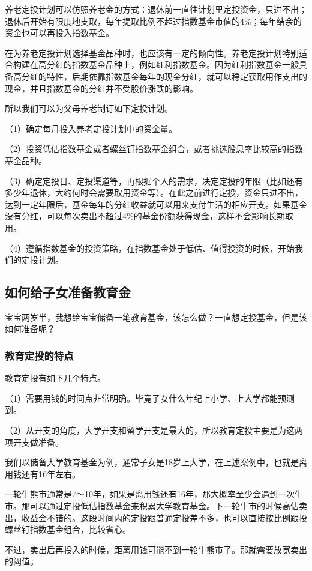 养老定投计划可以仿照养老金的方式：退休前一直往计划里定投资金，只进不出；退休后开始有限度地支取，每年提取比例不超过指数基金市值的4\%；每年结余的资金也可以再投入指数基金。

在为养老定投计划选择基金品种时，也应该有一定的倾向性。养老定投计划特别适合构建在高分红的指数基金品种上，例如红利指数基金。因为红利指数基金一般具备高分红的特性，后期依靠指数基金每年的现金分红，就可以稳定获取用作支出的现金，并且指数基金的分红并不受股价涨跌的影响。

所以我们可以为父母养老制订如下定投计划。

（1）确定每月投入养老定投计划中的资金量。

（2）投资低估指数基金或者螺丝钉指数基金组合，或者挑选股息率比较高的指数基金品种。

（3）确定定投日、定投渠道等，再根据个人的需求，决定定投的年限（比如还有多少年退休，大约何时会需要取用资金等）。在此之前进行定投，资金只进不出，达到一定年限后，基金每年的分红收益就可以用来支付生活的相应开支。如果基金没有分红，可以每次卖出不超过4\%的基金份额获得现金，这样不会影响长期取用。

（4）遵循指数基金的投资策略，在指数基金处于低估、值得投资的时候，开始我们的定投计划。

\subsection{如何给子女准备教育金}
{\kaishu 宝宝两岁半，我想给宝宝储备一笔教育基金，该怎么做？一直想定投基金，但是该如何准备呢？}

\subsubsection{教育定投的特点}

教育定投有如下几个特点。

（1）需要用钱的时间点非常明确。毕竟子女什么年纪上小学、上大学都能预测到。

（2）从开支的角度，大学开支和留学开支是最大的，所以教育定投主要是为这两项开支做准备。

我们以储备大学教育基金为例，通常子女是18岁上大学，在上述案例中，也就是离用钱还有16年左右。

一轮牛熊市通常是7～10年，如果是离用钱还有16年，那大概率至少会遇到一次牛市。那可以通过定投低估指数基金来积累大学教育基金。下一轮牛市的时候高估卖出，收益会不错的。这段时间内的定投跟普通定投差不多，也可以直接按比例跟投螺丝钉指数基金组合，比较省心。

不过，卖出后再投入的时候，距离用钱可能不到一轮牛熊市了。那就需要放宽卖出的阈值。

